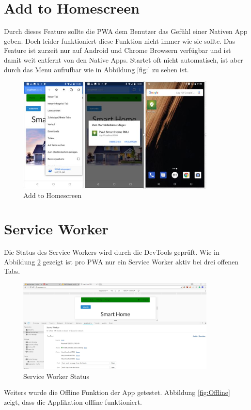 \newpage
\section{Add to Homescreen}
Durch dieses Feature sollte die \acs{PWA} dem Benutzer das Gefühl einer Nativen App geben. Doch leider funktioniert diese Funktion nicht immer wie sie sollte.
Das Feature ist zurzeit nur auf Android und Chrome Browsern verfügbar und ist damit weit entfernt von den Native Apps. Startet oft nicht automatisch, ist aber durch das Menu aufrufbar wie in Abbildung \ref{fig:} zu sehen ist.

\begin{figure}[h]
	\centering
	\includegraphics[width=10cm]{BilderAllgemein/Test/ADDHome}\medskip
	\caption{Add to Homescreen}
	\label{fig:ADDHome}
\end{figure}
\newpage

\section{Service Worker}
Die Status des Service Workers wird durch die DevTools geprüft.
Wie in Abbildung \ref{fig:SWTest} gezeigt ist pro \acs{PWA} nur ein Service Worker aktiv bei drei offenen Tabs. 

\begin{figure}[h]
	\centering
	\includegraphics[width=10cm]{BilderAllgemein/Test/SW}\medskip
	\caption{Service Worker Status}
	\label{fig:SWTest}
\end{figure}
Weiters wurde die Offline Funktion der App getestet.
Abbildung \ref{fig:Offline} zeigt, dass die Applikation offline funktioniert.

